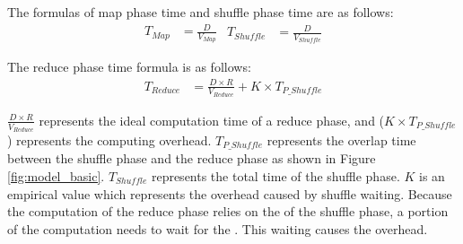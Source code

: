 {The formulas of map phase time and shuffle phase time are as follows:
\begin{equation}
\label{equation_Tmap}
\begin{aligned}
    T_{Map} &= {{\frac{D}{V_{Map}}}}
\end{aligned}
\begin{aligned}
    T_{Shuffle} &= {{\frac{D}{V_{Shuffle}}}}
\end{aligned}
\end{equation}


The reduce phase time formula is as follows:
\begin{equation}
\label{equation_Treduce}
\begin{aligned}
    T_{Reduce} &= \frac{D \times R}{V_{Reduce}} + K \times T_{P\_Shuffle}
\end{aligned}
\end{equation}


{\color{black}
\(\frac{D \times R}{V_{Reduce}}\) represents the ideal computation time of a reduce phase, and (\(K \times T_{P\_Shuffle}\)) represents the computing overhead.
\(T_{P\_Shuffle}\) represents the overlap time between the shuffle phase and the reduce phase as shown in Figure \ref{fig:model_basic}. \(T_{Shuffle}\) represents the total time of the shuffle phase. 
\(K\) is an empirical value which represents the overhead caused by shuffle waiting. 
Because the computation of the reduce phase relies on the  of the shuffle phase, a portion of the computation needs to wait for the . This waiting causes the overhead.

}}
